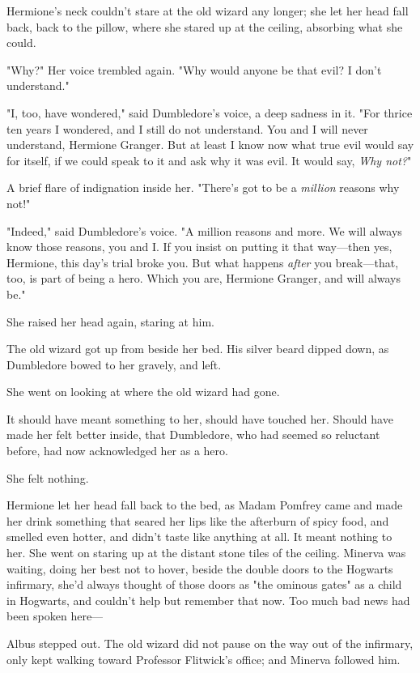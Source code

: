 Hermione's neck couldn't stare at the old wizard any longer; she let her head
fall back, back to the pillow, where she stared up at the ceiling, absorbing
what she could.

"Why?" Her voice trembled again. "Why would anyone be that evil? I don't
understand."

"I, too, have wondered," said Dumbledore's voice, a deep sadness in it. "For
thrice ten years I wondered, and I still do not understand. You and I will
never understand, Hermione Granger. But at least I know now what true evil
would say for itself, if we could speak to it and ask why it was evil. It would
say, \emph{Why not?}"

A brief flare of indignation inside her. "There's got to be a \emph{million}
reasons why not!"

"Indeed," said Dumbledore's voice. "A million reasons and more. We will always
know those reasons, you and I. If you insist on putting it that way---then yes,
Hermione, this day's trial broke you. But what happens \emph{after} you
break---that, too, is part of being a hero. Which you are, Hermione Granger,
and will always be."

She raised her head again, staring at him.

The old wizard got up from beside her bed. His silver beard dipped down, as
Dumbledore bowed to her gravely, and left.

She went on looking at where the old wizard had gone.

It should have meant something to her, should have touched her. Should have
made her felt better inside, that Dumbledore, who had seemed so reluctant
before, had now acknowledged her as a hero.

She felt nothing.

Hermione let her head fall back to the bed, as Madam Pomfrey came and made her
drink something that seared her lips like the afterburn of spicy food, and
smelled even hotter, and didn't taste like anything at all. It meant nothing to
her. She went on staring up at the distant stone tiles of the ceiling.
\sbreak
Minerva was waiting, doing her best not to hover, beside the double doors to
the Hogwarts infirmary, she'd always thought of those doors as "the ominous
gates" as a child in Hogwarts, and couldn't help but remember that now. Too
much bad news had been spoken here---

Albus stepped out. The old wizard did not pause on the way out of the
infirmary, only kept walking toward Professor Flitwick's office; and Minerva
followed him.

